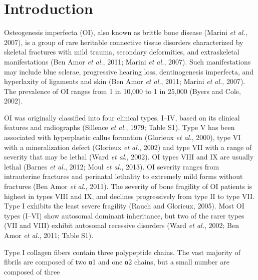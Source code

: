 \section*{Introduction}\par Osteogenesis imperfecta (OI), also known as brittle bone disease (Marini \textit{et al.}, 2007), is a group of rare
                heritable connective tissue disorders characterized by skeletal fractures with mild
                trauma, secondary deformities, and extraskeletal manifestations (Ben Amor \textit{et al.}, 2011; Marini \textit{et al.}, 2007). Such
                manifestations may include blue sclerae, progressive hearing loss, dentinogenesis
                imperfecta, and hyperlaxity of ligaments and skin (Ben Amor \textit{et al.}, 2011; Marini \textit{et al.}, 2007). The prevalence of OI ranges from
                1 in 10,000 to 1 in 25,000 (Byers and Cole,
                    2002).\par OI was originally classified into four clinical types, I–IV, based on its clinical
                features and radiographs (Sillence \textit{et
                        al.}, 1979; Table S1). Type V has been associated with hyperplastic
                callus formation (Glorieux \textit{et al.},
                    2000), type VI with a mineralization defect (Glorieux \textit{et al.}, 2002) and type VII with
                a range of severity that may be lethal (Ward
                        \textit{et al.}, 2002). OI types VIII and IX are usually
                lethal (Barnes \textit{et al.}, 2012;
                    Moul \textit{et al.}, 2013). OI
                severity ranges from intrauterine fractures and perinatal lethality to extremely
                mild forms without fractures (Ben Amor \textit{et
                        al.}, 2011). The severity of bone fragility of OI patients is
                highest in types VIII and IX, and declines progressively from type II to type VII.
                Type I exhibits the least severe fragility (Rauch
                    and Glorieux, 2005). Most OI types (I–VI) show autosomal dominant
                inheritance, but two of the rarer types (VII and VIII) exhibit autosomal recessive
                disorders (Ward \textit{et al.},
                2002; Ben Amor \textit{et al.},
                    2011; Table
                    S1).\par Type I collagen fibers contain three polypeptide chains. The vast majority of fibrils
                are composed of two α1 and one α2 chains, but a small number are composed of three
